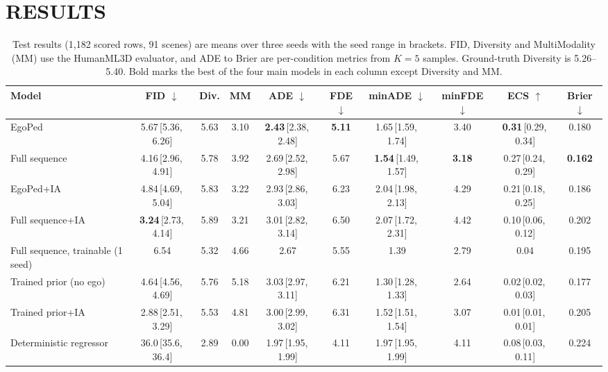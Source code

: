 \documentclass[letterpaper, 10 pt, conference]{ieeeconf}
\newcommand{\method}{EgoPed\xspace}
\newcommand{\fullseq}{Full sequence\xspace}
\newcommand{\ci}[2]{\,{\scriptsize[#1,\,#2]}}
\begin{document}
\section{RESULTS}
\label{sec:results}

\begin{table}[t]
  \centering
  \caption{Test results (1{,}182 scored rows, 91 scenes) are means over three seeds with the seed range in brackets. FID, Diversity and MultiModality (MM) use the HumanML3D evaluator, and ADE to Brier are per-condition metrics from $K{=}5$ samples. Ground-truth Diversity is 5.26--5.40. Bold marks the best of the four main models in each column except Diversity and MM.}
  \label{tab:main}
  \vspace{4pt}
  \small
  \setlength{\tabcolsep}{2.4pt}
  \begin{tabular}{lccc|cccccc}
    \toprule
    Model & FID $\downarrow$ & Div. & MM & ADE $\downarrow$ & FDE $\downarrow$ & minADE $\downarrow$ & minFDE $\downarrow$ & ECS $\uparrow$ & Brier $\downarrow$ \\
    \midrule
    \method & 5.67\ci{5.36}{6.26} & 5.63 & 3.10 & \textbf{2.43}\ci{2.38}{2.48} & \textbf{5.11} & 1.65\ci{1.59}{1.74} & 3.40 & \textbf{0.31}\ci{0.29}{0.34} & 0.180 \\
    \fullseq & 4.16\ci{2.96}{4.91} & 5.78 & 3.92 & 2.69\ci{2.52}{2.98} & 5.67 & \textbf{1.54}\ci{1.49}{1.57} & \textbf{3.18} & 0.27\ci{0.24}{0.29} & \textbf{0.162} \\
    \method+IA & 4.84\ci{4.69}{5.04} & 5.83 & 3.22 & 2.93\ci{2.86}{3.03} & 6.23 & 2.04\ci{1.98}{2.13} & 4.29 & 0.21\ci{0.18}{0.25} & 0.186 \\
    \fullseq+IA & \textbf{3.24}\ci{2.73}{4.14} & 5.89 & 3.21 & 3.01\ci{2.82}{3.14} & 6.50 & 2.07\ci{1.72}{2.31} & 4.42 & 0.10\ci{0.06}{0.12} & 0.202 \\
    \fullseq, trainable (1 seed) & 6.54 & 5.32 & 4.66 & 2.67 & 5.55 & 1.39 & 2.79 & 0.04 & 0.195 \\
    \midrule
    Trained prior (no ego) & 4.64\ci{4.56}{4.69} & 5.76 & 5.18 & 3.03\ci{2.97}{3.11} & 6.21 & 1.30\ci{1.28}{1.33} & 2.64 & 0.02\ci{0.02}{0.03} & 0.177 \\
    Trained prior+IA & 2.88\ci{2.51}{3.29} & 5.53 & 4.81 & 3.00\ci{2.99}{3.02} & 6.31 & 1.52\ci{1.51}{1.54} & 3.07 & 0.01\ci{0.01}{0.01} & 0.205 \\
    \midrule
    Deterministic regressor & 36.0\ci{35.6}{36.4} & 2.89 & 0.00 & 1.97\ci{1.95}{1.99} & 4.11 & 1.97\ci{1.95}{1.99} & 4.11 & 0.08\ci{0.03}{0.11} & 0.224 \\
    \bottomrule
  \end{tabular}
\end{table}
\end{document}
